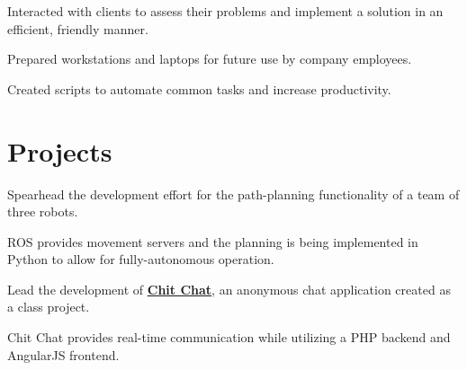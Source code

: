 \documentclass[]{deedy-resume-reversed}
\begin{document}
\begin{minipage}[t]{0.60\textwidth}
\begin{tightemize}
\item Interacted with clients to assess their problems and implement a solution in an efficient, friendly manner.
\item Prepared workstations and laptops for future use by company employees.
\item Created scripts to automate common tasks and increase productivity.
\end{tightemize}
\sectionsep


\section{Projects}
\begin{tightemize}
\item Spearhead the development effort for the path-planning functionality of a team of three robots.
\item ROS provides movement servers and the planning is being implemented in Python to allow for fully-autonomous operation.
\end{tightemize}
\sectionsep

\begin{tightemize}
\item Lead the development of \textbf{\href{https://github.com/user/repo}{Chit Chat}}, an anonymous chat application created as a class project.
\item Chit Chat provides real-time communication while utilizing a PHP backend and AngularJS frontend.
\end{tightemize}
\sectionsep




\end{minipage}
\end{document}
